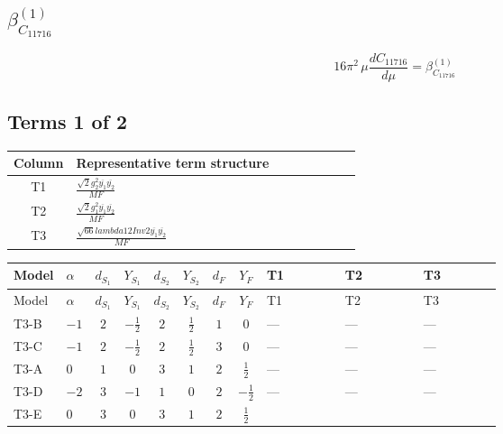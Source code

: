 \documentclass[8pt]{article}
\begin{document}
\begin{landscape}
\section*{$\beta_{C_{11716}}^{(1)}$}
\[16\pi^2\,\mu\frac{d C_{11716}}{d\mu}=\beta_{C_{11716}}^{(1)}\]
\subsection*{Terms 1 of 2}
\begin{center}
\begin{tabular}{@{}c >{\raggedright\arraybackslash}p{0.82\linewidth}@{}}
\toprule
Column & Representative term structure \\
\midrule
T1 & \(\displaystyle \frac{\sqrt{2} g_{2}^{2} \overline{y_{1}} \overline{y_{2}}}{MF}\) \\
\midrule
T2 & \(\displaystyle \frac{\sqrt{2} g_{1}^{2} \overline{y_{1}} \overline{y_{2}}}{MF}\) \\
\midrule
T3 & \(\displaystyle \frac{\sqrt{66} lambda12Inv2 \overline{y_{1}} \overline{y_{2}}}{MF}\) \\
\midrule
\bottomrule
\end{tabular}
\end{center}
\smallskip
\tiny
\begin{longtable}{@{}llcccccc >{\raggedright\arraybackslash}p{0.21\linewidth} >{\raggedright\arraybackslash}p{0.21\linewidth} >{\raggedright\arraybackslash}p{0.21\linewidth}@{}}
\toprule
Model & $\alpha$ & $d_{S_1}$ & $Y_{S_1}$ & $d_{S_2}$ & $Y_{S_2}$ & $d_F$ & $Y_F$ & T1 & T2 & T3 \\
\midrule
\endfirsthead
\toprule
Model & $\alpha$ & $d_{S_1}$ & $Y_{S_1}$ & $d_{S_2}$ & $Y_{S_2}$ & $d_F$ & $Y_F$ & T1 & T2 & T3 \\
\midrule
\endhead
T3-B & $-1$ & $2$ & $-\frac{1}{2}$ & $2$ & $\frac{1}{2}$ & $1$ & $0$ & --- & --- & --- \\
\midrule
T3-C & $-1$ & $2$ & $-\frac{1}{2}$ & $2$ & $\frac{1}{2}$ & $3$ & $0$ & --- & --- & --- \\
\midrule
T3-A & $0$ & $1$ & $0$ & $3$ & $1$ & $2$ & $\frac{1}{2}$ & --- & --- & --- \\
\midrule
T3-D & $-2$ & $3$ & $-1$ & $1$ & $0$ & $2$ & $-\frac{1}{2}$ & --- & --- & --- \\
\midrule
T3-E & $0$ & $3$ & $0$ & $3$ & $1$ & $2$ & $\frac{1}{2}$ & \scriptsize\adjustbox{max width=\linewidth}{$\begin{gathered} - \frac{33 \sqrt{2} g_{2}^{2} \overline{y_{1}} \overline{y_{2}}}{16 MF}\end{gathered}$} & \scriptsize\adjustbox{max width=\linewidth}{$\begin{gathered} - \frac{3 \sqrt{2} g_{1}^{2} \overline{y_{1}} \overline{y_{2}}}{16 MF}\end{gathered}$} & \scriptsize\adjustbox{max width=\linewidth}{$\begin{gathered} - \frac{3 \sqrt{66} lambda12Inv2 \overline{y_{1}} \overline{y_{2}}}{44 MF}\end{gathered}$} \\
\midrule
\bottomrule
\end{longtable}
\clearpage

\end{landscape}
\end{document}

